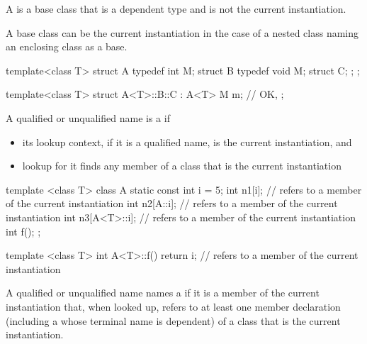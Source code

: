 \pnum
{}%
A  is a base class that is a dependent type and is
not the current instantiation.
\begin{note}
A base class can be the current instantiation in the case of a nested class
naming an enclosing class as a base.
\begin{example}
\begin{codeblock}
template<class T> struct A {
  typedef int M;
  struct B {
    typedef void M;
    struct C;
  };
};

template<class T> struct A<T>::B::C : A<T> {
  M m;                          // OK, 
};
\end{codeblock}
\end{example}
\end{note}

\pnum
{}%
A qualified or unqualified name is a
if
\begin{itemize}
\item
its lookup context, if it is a qualified name,
is the current instantiation, and
\item
lookup for it finds any member of a class that is the current instantiation
\end{itemize}
\begin{example}
\begin{codeblock}
template <class T> class A {
  static const int i = 5;
  int n1[i];                    //  refers to a member of the current instantiation
  int n2[A::i];                 //  refers to a member of the current instantiation
  int n3[A<T>::i];              //  refers to a member of the current instantiation
  int f();
};

template <class T> int A<T>::f() {
  return i;                     //  refers to a member of the current instantiation
}
\end{codeblock}
\end{example}

%
A qualified or unqualified name names a  if it is a
member of the current instantiation that, when looked up, refers to at least
one member declaration
(including a  whose terminal name is dependent)
of a class that is the current instantiation.

